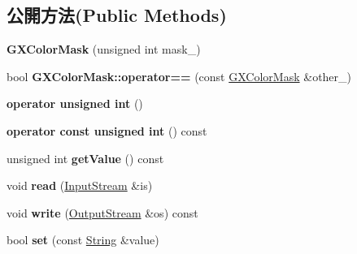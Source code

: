 \subsection*{公開方法(Public Methods)}
\begin{DoxyCompactItemize}
\item 
{\bfseries G\+X\+Color\+Mask} (unsigned int mask\+\_)\hypertarget{class_magnum_1_1_g_x_color_mask_a1cabb72945b11ec0e5ab810955b63fed}{}\label{class_magnum_1_1_g_x_color_mask_a1cabb72945b11ec0e5ab810955b63fed}

\item 
bool {\bfseries G\+X\+Color\+Mask\+::operator==} (const \hyperlink{class_magnum_1_1_g_x_color_mask}{G\+X\+Color\+Mask} \&other\+\_\+)\hypertarget{class_magnum_1_1_g_x_color_mask_a5975553bd84b962663c87ac3b3d006d5}{}\label{class_magnum_1_1_g_x_color_mask_a5975553bd84b962663c87ac3b3d006d5}

\item 
{\bfseries operator unsigned int} ()\hypertarget{class_magnum_1_1_g_x_color_mask_a9b60042a4b19cb23a4a26f6c899f8c65}{}\label{class_magnum_1_1_g_x_color_mask_a9b60042a4b19cb23a4a26f6c899f8c65}

\item 
{\bfseries operator const unsigned int} () const \hypertarget{class_magnum_1_1_g_x_color_mask_af2186fd904b78643ba279afd57fc0e12}{}\label{class_magnum_1_1_g_x_color_mask_af2186fd904b78643ba279afd57fc0e12}

\item 
unsigned int {\bfseries get\+Value} () const \hypertarget{class_magnum_1_1_g_x_color_mask_a89204a2a28a395eef0d1fe078e61cace}{}\label{class_magnum_1_1_g_x_color_mask_a89204a2a28a395eef0d1fe078e61cace}

\item 
void {\bfseries read} (\hyperlink{class_magnum_1_1_input_stream}{Input\+Stream} \&is)\hypertarget{class_magnum_1_1_g_x_color_mask_a33100b1d4286f681f438a13282df093e}{}\label{class_magnum_1_1_g_x_color_mask_a33100b1d4286f681f438a13282df093e}

\item 
void {\bfseries write} (\hyperlink{class_magnum_1_1_output_stream}{Output\+Stream} \&os) const \hypertarget{class_magnum_1_1_g_x_color_mask_a4b50806ddb163c795aa878c9db5a4a08}{}\label{class_magnum_1_1_g_x_color_mask_a4b50806ddb163c795aa878c9db5a4a08}

\item 
bool {\bfseries set} (const \hyperlink{class_magnum_1_1_string}{String} \&value)\hypertarget{class_magnum_1_1_g_x_color_mask_a78799535c4d4f57be0a08683fddfbe2f}{}\label{class_magnum_1_1_g_x_color_mask_a78799535c4d4f57be0a08683fddfbe2f}

\end{DoxyCompactItemize}
